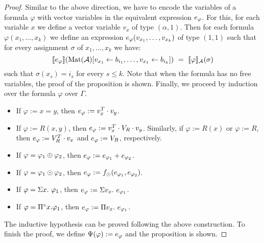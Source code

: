 \begin{proof}
Similar to the above direction, we have to encode the \langprod variables of a formula $\varphi$ with vector variables in the equivalent \langprod expression $e_\varphi$. For this, for each \langprod variable $x$ we define a vector variable $v_x$ of type $(\alpha, 1)$. Then for each formula $\varphi(x_1, \ldots, x_k)$ we define an expression $e_\varphi(v_{x_1}, \ldots, v_{x_k})$ of type $(1,1)$ such that for every assignment $\sigma$ of $x_1, \ldots, x_k$ we have:
$$
\sem{\evarphi}{\text{Mat}(\cA)[v_{x_1} \gets b_{i_1},\ldots,v_{x_1}\gets b_{i_k}]} \ = \ \ssem{\varphi}{\cA}(\sigma) 
$$
such that $\sigma(x_{s}) = i_s$ for every $s \leq k$. Note that when the formula has no free variables, the proof of the proposition is shown. Finally, we proceed by induction over the formula $\varphi$ over $\Gamma$.
\begin{itemize} \itemsep3mm
  \item If $\varphi:=x=y$, then $e_\varphi:= v_x^T \cdot v_{y}$.
  \item If $\varphi:=R(x,y)$, then $e_\varphi:=v_x^T \cdot V_R \cdot v_{y}$. Similarly, if $\varphi:=R(x)$ or $\varphi:=R$, then $e_\varphi:= V_R^T \cdot v_{x}$  and $e_\varphi:= V_R$, respectively. 
  \item If $\varphi = \varphi_1 \oplus \varphi_2$, then $e_\varphi:= e_{\varphi_1} + e_{\varphi_2}$.
  \item If $\varphi = \varphi_1 \odot \varphi_2$, then $e_\varphi:= f_\odot(e_{\varphi_1},e_{\varphi_2})$.
  \item If $\varphi = \Sigma x.\  \varphi_1$, then $e_\varphi :=\Sigma v_x.\ e_{\varphi_1}$.
  \item If $\varphi = \Pi^{\circ} x. \varphi_1$, then $e_\varphi := \Pi v_x.\ e_{\varphi_1}$.
\end{itemize}
The inductive hypothesis can be proved following the above construction. To finish the proof, we define $\Psi(\varphi) := e_\varphi$ and the proposition is shown.

\end{proof}
